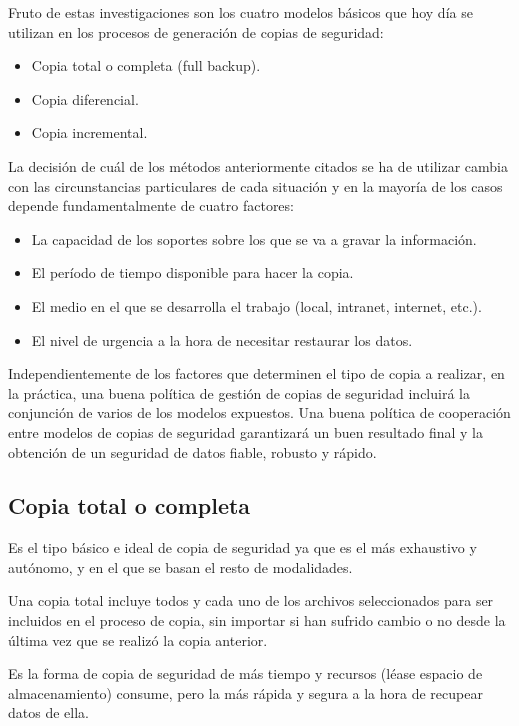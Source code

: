 \documentclass[12pt]{article}
\begin{document}
Fruto de estas investigaciones son los cuatro modelos básicos que hoy 
día se utilizan en los procesos de generación de copias de seguridad:
\begin{itemize}
\item Copia total o completa (full backup).
\item Copia diferencial.
\item Copia incremental.
\end{itemize}

La decisión de cuál de los métodos anteriormente citados se ha de 
utilizar cambia con las circunstancias particulares de cada situación 
y en la mayoría de los casos depende fundamentalmente de cuatro factores:

\begin{itemize}
\item La capacidad de los soportes sobre los que se va a gravar la 
información.
\item El período de tiempo disponible para hacer la copia.
\item El medio en el que se desarrolla el trabajo (local, intranet, 
internet, etc.).
\item El nivel de urgencia a la hora de necesitar restaurar los datos.
\end{itemize}

Independientemente de los factores que determinen el tipo de copia a 
realizar, en la práctica, una buena política de gestión de copias de 
seguridad incluirá la conjunción de varios de los modelos expuestos. Una 
buena política de cooperación entre modelos de copias de seguridad 
garantizará un buen resultado final y la obtención de un seguridad
de datos fiable, robusto y rápido.

\subsection*{Copia total o completa}
Es el tipo básico e ideal de copia de seguridad ya que es el más 
exhaustivo y autónomo, y en el que se basan el resto de modalidades.

Una copia total incluye todos y cada uno de los archivos seleccionados
para ser incluidos en el proceso de copia, sin importar si han 
sufrido cambio o no desde la última vez que se realizó la copia anterior.

Es la forma de copia de seguridad de más tiempo y recursos (léase espacio 
de almacenamiento) consume, pero la más rápida y segura a la hora de 
recupear datos de ella. 
\end{document}
